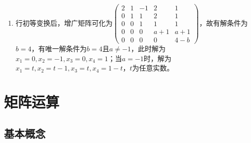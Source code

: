 \documentclass[a4paper,UTF8,fontset=windows]{ctexart}
\begin{document}
\begin{enumerate}
\item
行初等变换后，增广矩阵可化为$\begin{pmatrix}2&1&-1&2&1\\0&1&1&2&1\\0&0&1&1&1\\0&0&0&a+1&a+1\\0&0&0&0&4-b\end{pmatrix}$，故有解条件为$b=4$，有唯一解条件为$b=4$且$a\ne-1$，此时解为$x_1=0,x_2=-1,x_3=0,x_4=1$；当$a=-1$时，解为$x_1=t,x_2=t-1,x_3=t,x_4=1-t$，$t$为任意实数。
\end{enumerate}

\section{矩阵运算}
\subsection{基本概念}
\end{document}
